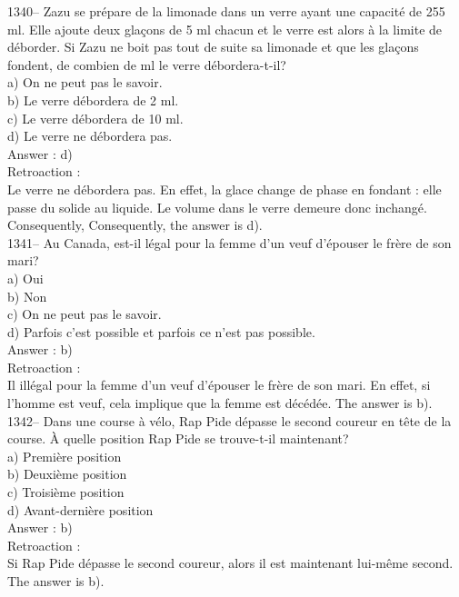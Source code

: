 ﻿\documentclass[letterpaper, 12pt]{article}
\begin{document}
1340-- Zazu se pr\'epare de la limonade dans un verre ayant une capacit\'e
de 255 ml.  Elle ajoute deux gla\c cons de 5 ml chacun et le verre est alors
\`a la limite de d\'eborder.  Si Zazu ne boit pas tout de suite sa limonade
et que les gla\c cons fondent, de combien de ml le verre d\'ebordera-t-il?\\
a) On ne peut pas le savoir.\\
b) Le verre d\'ebordera de 2 ml.\\
c) Le verre d\'ebordera de 10 ml.\\
d) Le verre ne d\'ebordera pas.\\

Answer : d)\\

Retroaction : \\
Le verre ne d\'ebordera pas.  En effet, la glace change de phase en fondant
: elle passe du solide au liquide.  Le volume dans le verre demeure donc
inchang\'e.  Consequently, Consequently, the answer is d).\\

1341-- Au Canada, est-il l\'egal pour la femme d'un veuf d'\'epouser le
fr\`ere de son mari?\\
a) Oui\\
b) Non\\
c) On ne peut pas le savoir.\\
d) Parfois c'est possible et parfois ce n'est pas possible.\\

Answer : b)\\

Retroaction : \\
Il ill\'egal pour la femme d'un veuf d'\'epouser le fr\`ere de son mari. En
effet, si l'homme est veuf, cela implique que la femme est d\'ec\'ed\'ee.
The answer is b).\\

1342-- Dans une course \`a v\'elo, Rap Pide d\'epasse le second coureur en
t\^ete de la course.  \`A quelle position Rap Pide se trouve-t-il
maintenant?\\
a) Premi\`ere position\\
b) Deuxi\`eme position\\
c) Troisi\`eme position\\
d) Avant-derni\`ere position\\

Answer : b)\\

Retroaction : \\
Si Rap Pide d\'epasse le second coureur, alors il est maintenant lui-m\^eme
second.  The answer is b).\\
\end{document}

